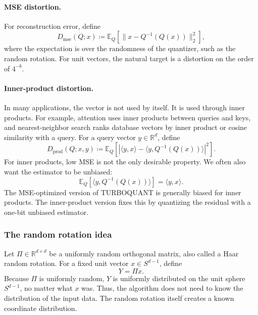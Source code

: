 \paragraph{MSE distortion.}
For reconstruction error, define
\begin{equation}
    D_{\mathrm{mse}}(Q;x)
    \coloneqq
    \mathbb E_Q\left[\|x-Q^{-1}(Q(x))\|_2^2\right],
\end{equation}
where the expectation is over the randomness of the quantizer, such as the random rotation.
For unit vectors, the natural target is a distortion on the order of $4^{-b}$.

\paragraph{Inner-product distortion.}
In many applications, the vector is not used by itself.
It is used through inner products.
For example, attention uses inner products between queries and keys, and nearest-neighbor search ranks database vectors by inner product or cosine similarity with a query.
For a query vector $y\in\mathbb R^d$, define
\begin{equation}
    D_{\mathrm{prod}}(Q;x,y)
    \coloneqq
    \mathbb E_Q\left[
        \left|\langle y,x\rangle-
        \langle y,Q^{-1}(Q(x))\rangle\right|^2
    \right].
\end{equation}
For inner products, low MSE is not the only desirable property.
We often also want the estimator to be unbiased:
\begin{equation}
    \mathbb E_Q\left[\langle y,Q^{-1}(Q(x))\rangle\right]
    =\langle y,x\rangle.
\end{equation}
The MSE-optimized version of TURBOQUANT is generally biased for inner products.
The inner-product version fixes this by quantizing the residual with a one-bit unbiased estimator.

\subsubsection*{The random rotation idea}

Let $\Pi\in\mathbb R^{d\times d}$ be a uniformly random orthogonal matrix, also called a Haar random rotation.
For a fixed unit vector $x\in S^{d-1}$, define
\begin{equation}
    Y=\Pi x.
\end{equation}
Because $\Pi$ is uniformly random, $Y$ is uniformly distributed on the unit sphere $S^{d-1}$, no matter what $x$ was.
Thus, the algorithm does not need to know the distribution of the input data.
The random rotation itself creates a known coordinate distribution.

